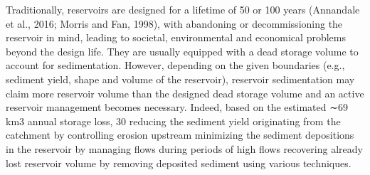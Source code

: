 Traditionally, reservoirs are designed for a lifetime of 50 or 100 years (Annandale et al., 2016; Morris and Fan, 1998), with abandoning or decommissioning the reservoir in mind, leading to societal, environmental and economical problems beyond the design life. They are usually equipped with a dead storage volume to account for sedimentation. However, depending on the given boundaries (e.g., sediment yield, shape and volume of the reservoir), reservoir sedimentation may claim more reservoir volume than the designed dead storage volume and an active reservoir management becomes necessary. Indeed, based on the estimated ∼69 km3 annual storage loss, 30%
reducing the sediment yield originating from the catchment by controlling erosion upstream
minimizing the sediment depositions in the reservoir by managing flows during periods of high flows
recovering already lost reservoir volume by removing deposited sediment using various techniques.
